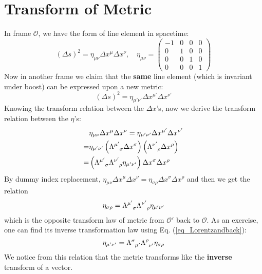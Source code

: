 \documentclass[11pt]{article}
\begin{document}
\section{Transform of Metric}

In frame $\mathcal{O}$, we have the form of line element in spacetime:
\begin{equation}
    (\Delta s)^2=\eta_{\mu\nu}\Delta x^\mu\Delta x^\nu, \quad \eta_{\mu\nu}=
    \begin{pmatrix}
        -1 & 0 & 0 & 0 \\
        0 & 1 & 0 & 0 \\
        0 & 0 & 1 & 0 \\
        0 & 0 & 0 & 1
    \end{pmatrix}
\end{equation}
Now in another frame we claim that the \textbf{same} line element (which is invariant under boost) can be expressed upon a new metric:
\begin{equation}
    (\Delta s)^2=\eta_{\mu'\nu'}\Delta x^{\mu'}\Delta x^{\nu'}
\end{equation}
Knowing the transform relation between the $\Delta x$'s, now we derive the transform relation between the $\eta$'s:
\begin{equation}\begin{aligned}
    & \eta_{\mu\nu}\Delta x^\mu\Delta x^\nu=\eta_{\mu'\nu'}\Delta x^{\mu'}\Delta x^{\nu'} \\
    = & \eta_{\mu'\nu'}\left(\tensor{\Lambda}{^{\mu'}_\sigma}\Delta x^\sigma\right)\left(\tensor{\Lambda}{^{\nu'}_\rho}\Delta x^\rho\right) \\
    = & \left(\tensor{\Lambda}{^{\mu'}_\sigma}\tensor{\Lambda}{^{\nu'}_\rho}\eta_{\mu'\nu'}\right)\Delta x^\sigma\Delta x^\rho
\end{aligned}\end{equation}
By dummy index replacement, $\eta_{\mu\nu}\Delta x^\mu\Delta x^\nu=\eta_{\sigma\rho}\Delta x^\sigma\Delta x^\rho$ and then we get the relation
\begin{equation}
    \eta_{\sigma\rho}=\tensor{\Lambda}{^{\mu'}_\sigma}\tensor{\Lambda}{^{\nu'}_\rho}\eta_{\mu'\nu'}
\end{equation}
which is the opposite transform law of metric from $\mathcal{O}'$ back to $\mathcal{O}$. As an exercise, one can find its inverse transformation law using Eq. (\ref{eq_Lorentzandback}):
\begin{equation}
    \eta_{\mu'\nu'}=\tensor{\Lambda}{^\sigma_{\mu'}}\tensor{\Lambda}{^\rho_{\nu'}}\eta_{\sigma\rho}
    \label{eq_metrictransform}
\end{equation}
We notice from this relation that the metric transforms like the \textbf{inverse} transform of a vector.
\end{document}
